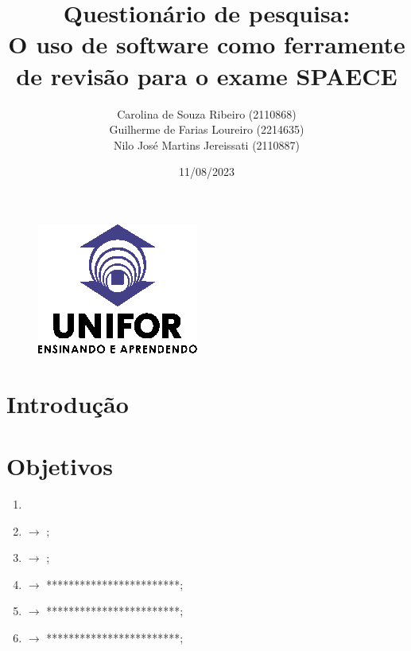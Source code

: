 \documentclass[17pt]{extarticle} %
\begin{document}
    \begin{figure}[t]
        \centering
        \includegraphics[]{unifor-logo-200x162.png}
        \label{Logo da Unifor}
    \end{figure}

    
    \title{
        \textbf{Questionário de pesquisa:}\\O uso de software como ferramente de revisão para o exame SPAECE
    }

    \author{
        Carolina de Souza Ribeiro (2110868)\\
        Guilherme de Farias Loureiro (2214635)\\
        Nilo José Martins Jereissati (2110887)
    }

    \date{11/08/2023}

    \maketitle

    \newpage


    \section{Introdução} 
        
    \newpage



    \section{Objetivos}
        \begin{enumerate} %
            \item 
            \item $\rightarrow$ ;
            \item $\rightarrow$ ;
            \item $\rightarrow$ ************************;
            \item $\rightarrow$ ************************;
            \item $\rightarrow$ ************************;
        \end{enumerate}
\end{document}

